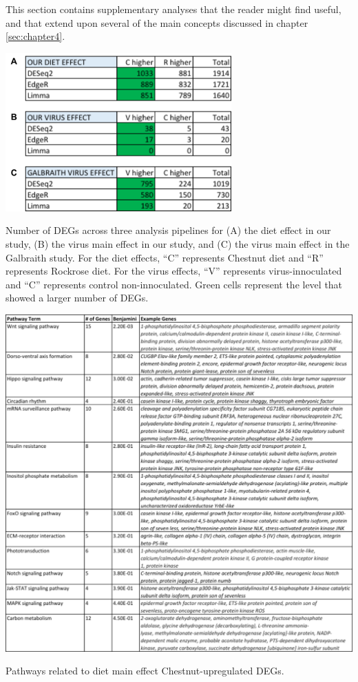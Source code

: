 \documentclass[11pt,a4paper,oldfontcommands,openany]{memoir}
\numberwithin{equation}{section} %
\begin{document}
This section contains supplementary analyses that the reader might find useful, and that extend upon several of the main concepts discussed in chapter \ref{sec:chapter4}.

\begin{table}
  \centering
  \includegraphics[width=0.65\textwidth]{Images/mainEffectDEGs}
  \caption{Number of DEGs across three analysis pipelines for (A) the diet effect in our study, (B) the virus main effect in our study, and (C) the virus main effect in the Galbraith study. For the diet effects, ``C'' represents Chestnut diet and ``R'' represents Rockrose diet. For the virus effects, ``V'' represents virus-innoculated and ``C'' represents control non-innoculated. Green cells represent the level that showed a larger number of DEGs.}
  \label{tbl:mainEffectDEGs}
\end{table}

\begin{table}[H]
  \includegraphics[width=\textwidth]{Images/ChestnutPathways}
  \caption{Pathways related to diet main effect Chestnut-upregulated DEGs.}
  \label{tbl:ChestnutPathways}
\end{table}
\end{document}

